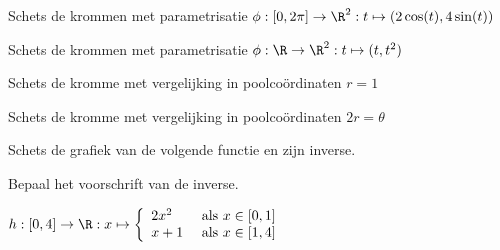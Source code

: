 Schets de krommen met  parametrisatie $ \phi: [0,2\pi] \rightarrow \R^2: t\mapsto (2\cos(t),4\sin(t))$

Schets de krommen met  parametrisatie $ \phi: \R \rightarrow \R^2: t\mapsto (t,t^2)$

\centerline{\hspace{3cm}}

\centerline{\hspace{3cm}}
\centerline{\hspace{3cm}}

Schets de kromme met vergelijking in poolco\"ordinaten $r=1$

Schets de kromme met vergelijking in poolco\"ordinaten $2r=\theta$


Schets de grafiek van de volgende functie en zijn inverse. 

Bepaal het voorschrift van de inverse.

$ h: [0,4] \rightarrow \R: x\mapsto
 \left\{\ba{ll} 2 x^2 & \mbox{ als } x \in [0,1]\\
               x+1   & \mbox{ als } x \in [1,4]
       \ea\right.
$


